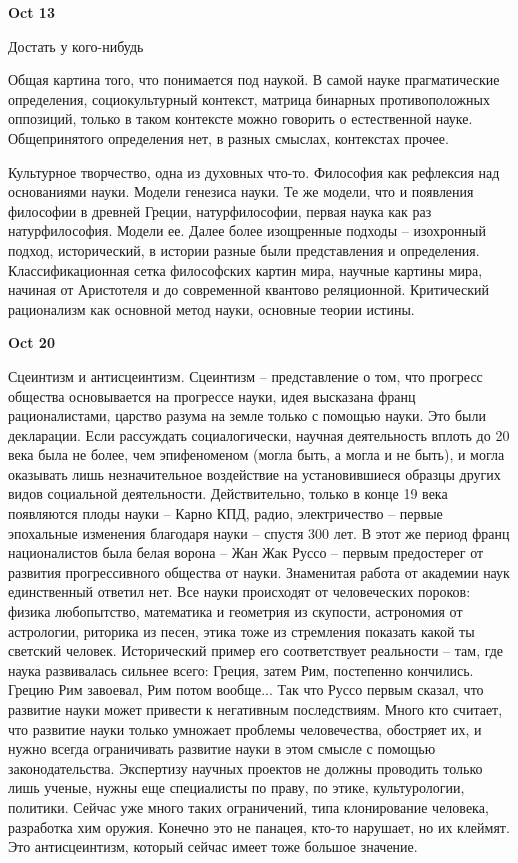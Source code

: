 \documentclass[a4paper, 12pt]{article}
\begin{document}
\hfill \textbf{Oct 13}

Достать у кого-нибудь

Общая картина того, что понимается под наукой. В самой науке 
прагматические определения, социокультурный контекст, матрица бинарных 
противоположных оппозиций, только в таком контексте можно говорить 
о естественной науке. Общепринятого определения нет, в разных смыслах, 
контекстах прочее.

Культурное творчество, одна из духовных что-то. Философия как рефлексия 
над основаниями науки. Модели генезиса науки. Те же модели, что 
и появления философии в древней Греции, натурфилософии, первая наука как 
раз натурфилософия. Модели ее. Далее более изощренные подходы -- 
изохронный подход, исторический, в истории разные были представления 
и определения. Классификационная сетка философских картин мира, научные 
картины мира, начиная от Аристотеля и до современной квантово 
реляционной. Критический рационализм как основной метод науки, основные 
теории истины.

\hfill \textbf{Oct 20}

Сцеинтизм и антисцеинтизм. Сцеинтизм -- представление о том, что 
прогресс общества основывается на прогрессе науки, идея высказана франц 
рационалистами, царство разума на земле только с помощью науки. Это были 
декларации. Если рассуждать социалогически, научная деятельность вплоть 
до 20 века была не более, чем эпифеноменом (могла быть, а могла и не 
быть), и могла оказывать лишь незначительное воздействие на 
установившиеся образцы других видов социальной деятельности. 
Действительно, только в конце 19 века появляются плоды науки -- Карно 
КПД, радио, электричество -- первые эпохальные изменения благодаря науки 
-- спустя 300 лет. В этот же период франц националистов была белая 
ворона -- Жан Жак Руссо -- первым предостерег от развития прогрессивного 
общества от науки. Знаменитая работа от академии наук единственный 
ответил нет. Все науки происходят от человеческих пороков: физика 
любопытство, математика и геометрия из скупости, астрономия от 
астрологии, риторика из песен, этика тоже из стремления показать какой 
ты светский человек. Исторический пример его соответствует реальности -- 
там, где наука развивалась сильнее всего: Греция, затем Рим, постепенно 
кончились. Грецию Рим завоевал, Рим потом вообще... Так что Руссо первым 
сказал, что развитие науки может привести к негативным последствиям. 
Много кто считает, что развитие науки только умножает проблемы 
человечества, обостряет их, и нужно всегда ограничивать развитие науки 
в этом смысле с помощью законодательства. Экспертизу научных проектов не 
должны проводить только лишь ученые, нужны еще специалисты по праву, по 
этике, культурологии, политики. Сейчас уже много таких ограничений, типа 
клонирование человека, разработка хим оружия. Конечно это не панацея, 
кто-то нарушает, но их клеймят. Это антисцеинтизм, который сейчас имеет 
тоже большое значение.
\end{document}
